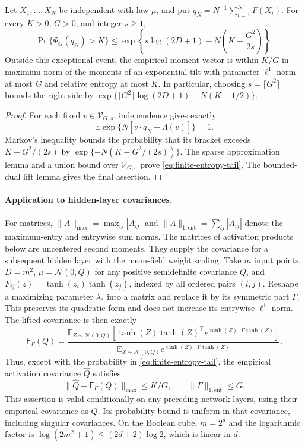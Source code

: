 \begin{proposition}
\label{prop:finite-entropy-certificate}
Let $X_1,\ldots,X_N$ be independent with law $\mu$, and put
$q_N=N^{-1}\sum_{i=1}^N F(X_i)$. For every $K>0$, $G>0$, and integer
$s\geq1$,
\begin{equation}\label{eq:finite-entropy-tail}
 \Pr\{\Psi_G(q_N)>K\}
 \leq\exp\left\{s\log(2D+1)
          -N\left(K-\frac{G^2}{2s}\right)\right\}.
\end{equation}
Outside this exceptional event, the empirical moment vector is within
$K/G$ in maximum norm of the moments of an exponential tilt with parameter
$\ell^1$ norm at most $G$ and relative entropy at most $K$.
In particular, choosing $s=\lceil G^2\rceil$ bounds the right side by
$\exp\{\lceil G^2\rceil\log(2D+1)-N(K-1/2)\}$.
\end{proposition}
\begin{proof}
For each fixed $v\in\mathcal V_{G,s}$, independence gives exactly
\[
 \mathbb E\exp\{N[v\cdot q_N-\Lambda(v)]\}=1.
\]
Markov's inequality bounds the probability that its bracket exceeds
$K-G^2/(2s)$ by $\exp\{-N(K-G^2/(2s))\}$.
The sparse approximation lemma and a union bound over
$\mathcal V_{G,s}$ prove \eqref{eq:finite-entropy-tail}.
The bounded-dual lift lemma gives the final assertion.
\end{proof}

\paragraph{Application to hidden-layer covariances.}
For matrices, $\|A\|_{\max}=\max_{ij}|A_{ij}|$ and
$\|A\|_{1,\mathrm{ent}}=\sum_{ij}|A_{ij}|$ denote the maximum-entry and
entrywise sum norms. The matrices of activation products below are
uncentered second moments. They supply the covariance for a subsequent
hidden layer with the mean-field weight scaling.
Take $m$ input points, $D=m^2$, $\mu=\mathcal N(0,Q)$ for any positive
semidefinite covariance $Q$, and $F_{ij}(z)=\tanh(z_i)\tanh(z_j)$,
indexed by all ordered pairs $(i,j)$. Reshape a maximizing parameter
$\lambda_*$ into a matrix and replace it by its symmetric part $\Gamma$.
This preserves its quadratic form and does not increase its entrywise
$\ell^1$ norm. The lifted covariance is then exactly
\[
 \mathsf F_\Gamma(Q)=
 \frac{\mathbb E_{Z\sim\mathcal N(0,Q)}
    [\tanh(Z)\tanh(Z)^\top e^{\tanh(Z)^\top\Gamma\tanh(Z)}]}
      {\mathbb E_{Z\sim\mathcal N(0,Q)}
    e^{\tanh(Z)^\top\Gamma\tanh(Z)}}.
\]
Thus, except with the probability in \eqref{eq:finite-entropy-tail}, the
empirical activation covariance $\widehat Q$ satisfies
\[
 \|\widehat Q-\mathsf F_\Gamma(Q)\|_{\max}\leq K/G,
 \qquad \|\Gamma\|_{1,\mathrm{ent}}\leq G.
\]
This assertion is valid conditionally on any preceding network layers,
using their empirical covariance as $Q$. Its probability bound is uniform
in that covariance, including singular covariances. On the Boolean cube,
$m=2^d$ and the logarithmic factor is
$\log(2m^2+1)\leq(2d+2)\log2$, which is linear in $d$.
